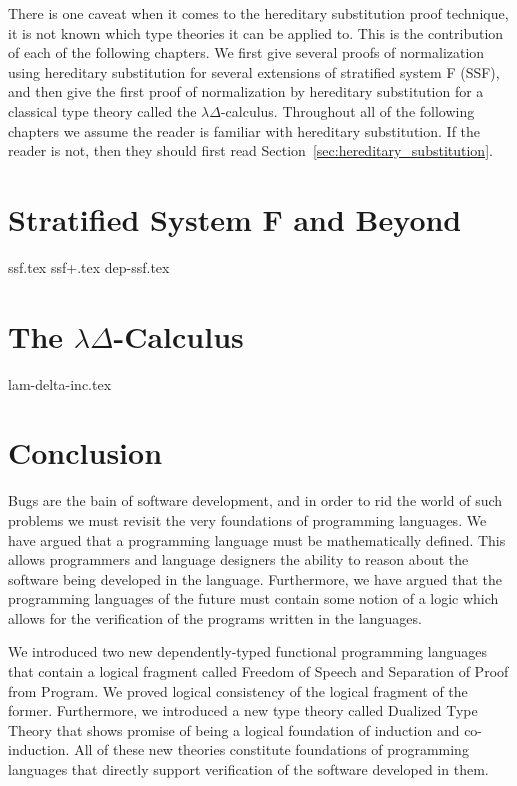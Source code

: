 \documentclass[phd,appendix,dedicationpage,ackpage,epigraphpage]{uithesis}
\begin{document}
There is one caveat when it comes to the hereditary substitution proof
technique, it is not known which type theories it can be applied to.
This is the contribution of each of the following chapters.  We first
give several proofs of normalization using hereditary substitution for
several extensions of stratified system F (SSF), and then give the
first proof of normalization by hereditary substitution for a
classical type theory called the $\lambda\Delta$-calculus.  Throughout
all of the following chapters we assume the reader is familiar with
hereditary substitution.  If the reader is not, then they should first
read Section~\ref{sec:hereditary_substitution}.

\chapter{Stratified System F and Beyond}
\label{chap:stratified_system_f_and_beyond}
{ssf.tex}
{ssf+.tex}
{dep-ssf.tex}

\chapter{The $\lambda\Delta$-Calculus}
\label{chap:the_lambdadelta-calculus}
{lam-delta-inc.tex}


\chapter{Conclusion}
\label{chap:conclusion}

Bugs are the bain of software development, and in order to rid the
world of such problems we must revisit the very foundations of
programming languages.  We have argued that a programming language
must be mathematically defined.  This allows programmers and language
designers the ability to reason about the software being developed in
the language.  Furthermore, we have argued that the programming
languages of the future must contain some notion of a logic which
allows for the verification of the programs written in the languages.

We introduced two new dependently-typed functional programming
languages that contain a logical fragment called Freedom of Speech and
Separation of Proof from Program.  We proved logical consistency of
the logical fragment of the former.  Furthermore, we introduced a new
type theory called Dualized Type Theory that shows promise of being a
logical foundation of induction and co-induction.  All of these new
theories constitute foundations of programming languages that directly
support verification of the software developed in them.
\end{document}
